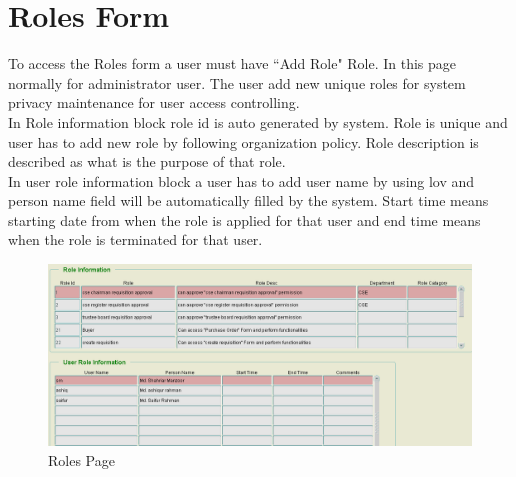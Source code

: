 \documentclass[12pt]{report} %
\begin{document}
\section{Roles Form}
To access the Roles form a user must have ``Add Role" Role. In this page normally for administrator user. The user add new unique roles for system privacy maintenance for user access controlling.\\
In Role information block role id is auto generated by system. Role is unique and user has to add new role by following organization policy. Role description is described as what is the purpose of that role.\\
In user role information block a user has to add user name by using lov and person name field will be automatically filled by the system. Start time means starting date from when the role is applied for that user and end time means when the role is terminated for that user. 
\begin{figure}[h]
	\begin{center}
	\includegraphics[width=1\textwidth]{pic/Roles_page.PNG}
	\end{center}
	\caption{Roles Page}
	\label{fig:Roles_page}
\end{figure}
\clearpage
\end{document}
